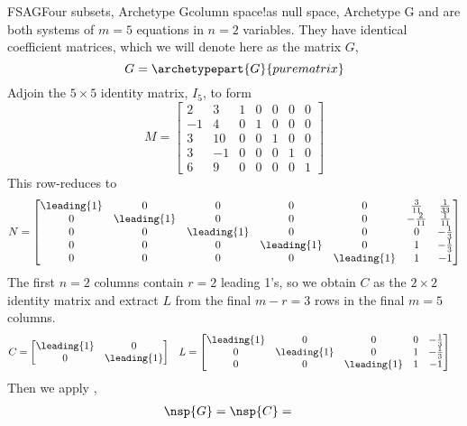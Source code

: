 \begin{example}{FSAG}{Four subsets, Archetype G}{column space!as null space, Archetype G}
%
 and  are both systems of $m=5$ equations in $n=2$ variables.  They have identical coefficient matrices, which we will denote here as the matrix $G$,
%
\begin{equation*}
G=
\archetypepart{G}{purematrix}
\end{equation*}
%
Adjoin the $5\times 5$ identity matrix, $I_5$, to form
%
\begin{equation*}
M=
\begin{bmatrix}
2 & 3 & 1&0&0&0&0\\
-1 & 4 & 0&1&0&0&0\\ 
3 & 10 & 0&0&1&0&0\\ 
3 &  -1 & 0&0&0&1&0\\ 
6 & 9 & 0&0&0&0&1
\end{bmatrix}
\end{equation*}
%
This row-reduces to
%
\begin{equation*}
N=
\begin{bmatrix}
\leading{1} & 0 & 0 & 0 & 0 & \frac{3}{11} & \frac{1}{33}\\ 
0 & \leading{1} & 0 & 0 & 0 & -\frac{2}{11} & \frac{1}{11}\\
0 & 0 & \leading{1} & 0 & 0 & 0 & -\frac{1}{3}\\
0 & 0 & 0 & \leading{1} & 0 & 1 & -\frac{1}{3}\\ 
0 & 0 & 0 & 0 & \leading{1} & 1 & -1
\end{bmatrix}
\end{equation*}
%
The first $n=2$ columns contain $r=2$ leading 1's, so we obtain $C$ as the $2\times 2$ identity matrix and extract $L$ from the final $m-r=3$ rows in the final $m=5$ columns.
%
\begin{align*}
C&=
\begin{bmatrix}
\leading{1} & 0\\
0 & \leading{1}
\end{bmatrix}
&
L&=
\begin{bmatrix}
\leading{1} & 0 & 0 & 0 & -\frac{1}{3}\\
0 & \leading{1}  & 0 & 1 & -\frac{1}{3}\\ 
0 & 0 & \leading{1}  & 1 & -1
\end{bmatrix}
\end{align*}
%
Then we apply ,
%
\begin{align*}
\nsp{G}=\nsp{C}&=

\end{align*}
\end{example}

